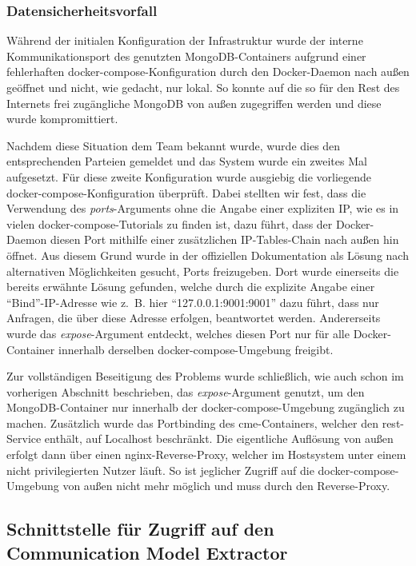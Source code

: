 \subsubsection{Datensicherheitsvorfall}

Während der initialen Konfiguration der Infrastruktur wurde der interne
Kommunikationsport des genutzten MongoDB-Containers aufgrund einer
fehlerhaften docker-compose-Konfiguration durch den Docker-Daemon nach außen
geöffnet und nicht, wie gedacht, nur lokal. So konnte auf die so für den Rest
des Internets frei zugängliche MongoDB von außen zugegriffen werden und diese
wurde kompromittiert.

Nachdem diese Situation dem Team bekannt wurde, wurde dies den entsprechenden
Parteien gemeldet und das System wurde ein zweites Mal aufgesetzt. Für diese
zweite Konfiguration wurde ausgiebig die vorliegende
docker-compose-Konfiguration überprüft. Dabei stellten wir fest, dass die
Verwendung des \textit{ports}-Arguments ohne die Angabe einer expliziten IP,
wie es in vielen docker-compose-Tutorials zu finden ist, dazu führt, dass der
Docker-Daemon diesen Port mithilfe einer zusätzlichen IP-Tables-Chain nach
außen hin öffnet. Aus diesem Grund wurde in der offiziellen Dokumentation als
Lösung nach alternativen Möglichkeiten gesucht, Ports freizugeben. Dort wurde
einerseits die bereits erwähnte Lösung gefunden, welche durch die explizite
Angabe einer \enquote{Bind}-IP-Adresse wie z.~B. hier
\enquote{127.0.0.1:9001:9001} dazu führt, dass nur Anfragen, die über diese
Adresse erfolgen, beantwortet werden. Andererseits wurde das
\textit{expose}-Argument entdeckt, welches diesen Port nur für alle
Docker-Container innerhalb derselben docker-compose-Umgebung freigibt.

Zur vollständigen Beseitigung des Problems wurde schließlich, wie auch schon
im vorherigen Abschnitt beschrieben,  das \textit{expose}-Argument genutzt, um den MongoDB-Container nur
innerhalb der docker-compose-Umgebung zugänglich zu machen. Zusätzlich wurde
das Portbinding des \gls{cme}-Containers, welcher den \gls{rest}-Service
enthält, auf Localhost beschränkt. Die eigentliche Auflösung von außen erfolgt
dann über einen nginx-Reverse-Proxy, welcher im Hostsystem unter einem nicht
privilegierten Nutzer läuft. So ist jeglicher Zugriff auf die
docker-compose-Umgebung von außen nicht mehr möglich und muss durch den
Reverse-Proxy.

\subsection{Schnittstelle für Zugriff auf den Communication Model Extractor}


